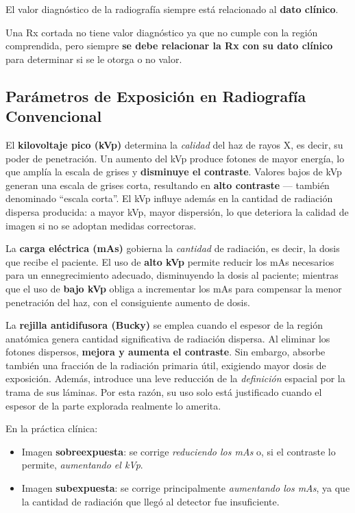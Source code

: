 	El valor diagnóstico de la radiografía siempre está relacionado al
	\textbf{dato clínico}.
	
	\begin{tcolorbox}[colback=red!10, colframe=red, title=Importante]
		Una Rx cortada no tiene valor diagnóstico ya que no cumple con la región
		comprendida, pero siempre \textbf{se debe relacionar la Rx con su dato clínico}
		para determinar si se le otorga o no valor.
	\end{tcolorbox}
	
	\subsection{Parámetros de Exposición en Radiografía Convencional}
	
	El \textbf{kilovoltaje pico (kVp)} determina la \textit{calidad} del haz de
	rayos X, es decir, su poder de penetración. Un aumento del kVp produce fotones
	de mayor energía, lo que amplía la escala de grises y \textbf{disminuye el
		contraste}. Valores bajos de kVp generan una escala de grises corta, resultando
	en \textbf{alto contraste} --- también denominado ``escala corta''. El kVp influye
	además en la cantidad de radiación dispersa producida: a mayor kVp, mayor
	dispersión, lo que deteriora la calidad de imagen si no se adoptan medidas
	correctoras.
	
	La \textbf{carga eléctrica (mAs)} gobierna la \textit{cantidad} de radiación, es
	decir, la dosis que recibe el paciente. El uso de \textbf{alto kVp} permite
	reducir los mAs necesarios para un ennegrecimiento adecuado, disminuyendo la dosis
	al paciente; mientras que el uso de \textbf{bajo kVp} obliga a incrementar los mAs
	para compensar la menor penetración del haz, con el consiguiente aumento de dosis.
	
	La \textbf{rejilla antidifusora (Bucky)} se emplea cuando el espesor de la región
	anatómica genera cantidad significativa de radiación dispersa. Al eliminar los
	fotones dispersos, \textbf{mejora y aumenta el contraste}. Sin embargo, absorbe
	también una fracción de la radiación primaria útil, exigiendo mayor dosis de
	exposición. Además, introduce una leve reducción de la \textit{definición} espacial
	por la trama de sus láminas. Por esta razón, su uso solo está justificado cuando el
	espesor de la parte explorada realmente lo amerita.
	
	En la práctica clínica:
	\begin{itemize}
		\item Imagen \textbf{sobreexpuesta}: se corrige \textit{reduciendo los mAs} o,
		si el contraste lo permite, \textit{aumentando el kVp}.
		\item Imagen \textbf{subexpuesta}: se corrige principalmente
		\textit{aumentando los mAs}, ya que la cantidad de radiación que llegó al
		detector fue insuficiente.
	\end{itemize}
	
